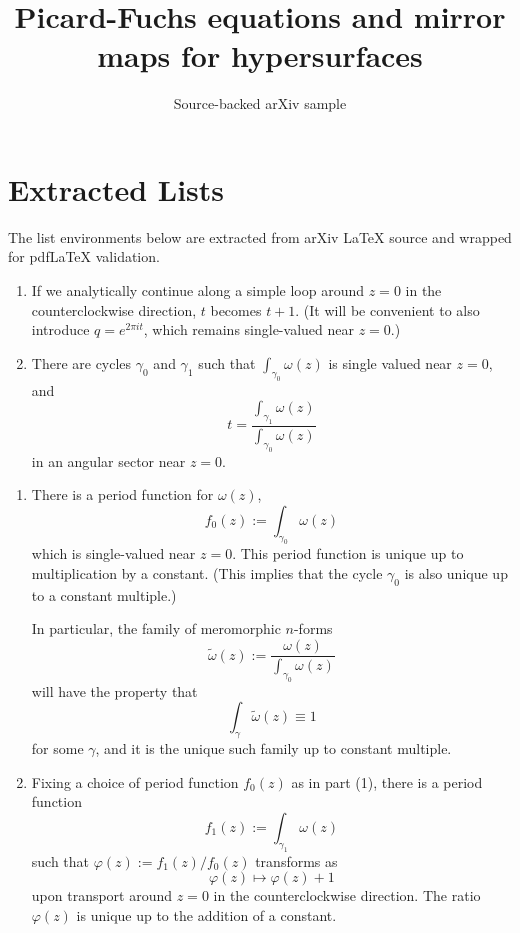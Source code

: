 \documentclass[11pt]{article}
\title{Picard-Fuchs equations and mirror maps for hypersurfaces}
\author{Source-backed arXiv sample}
\date{}
\begin{document}
\maketitle
\section{Extracted Lists}

The list environments below are extracted from arXiv LaTeX source and wrapped for pdfLaTeX validation.

\begin{enumerate}
\item
If we analytically continue along
 a simple loop around $z=0$ in the counterclockwise direction, $t$
becomes $t+1$.
(It will be convenient to also introduce $q=e^{2\pi it}$, which
remains single-valued near $z=0$.)

\item
There are cycles $\gamma_0$ and $\gamma_1$ such that
$\int_{\gamma_0}\omega(z)$
is single valued near $z=0$, and
\[t=\frac{\int_{\gamma_1}\omega(z)}{\int_{\gamma_0}\omega(z)}\]
in an angular sector near $z=0$.
\end{enumerate}

\begin{enumerate}
\item
There is a period function for $\omega(z)$,
\[f_0(z):=\int_{\gamma_0}\omega(z)\]
which is single-valued near $z=0$.  This period function is unique up to
multiplication by a constant.
(This implies that the cycle $\gamma_0$ is also unique up to a
constant multiple.)

In particular, the family of meromorphic $n$-forms
\[\widetilde\omega(z):=\frac{\omega(z)}{\int_{\gamma_0}\omega(z)}\]
will have the property that
\[\int_{\gamma}\widetilde\omega(z)\equiv1\]
for some $\gamma$, and it is the unique such family up to constant multiple.

\item
Fixing a choice of period function $f_0(z)$ as in part (1), there is a
period function
\[f_1(z):=\int_{\gamma_1}\omega(z)\]
such that $\varphi(z):=f_1(z)/f_0(z)$ transforms as
\[\varphi(z)\mapsto\varphi(z)+1\]
upon transport around $z=0$ in the counterclockwise direction.
The ratio $\varphi(z)$ is unique up to the addition of a constant.
\end{enumerate}
\end{document}
